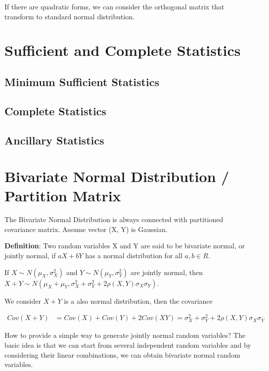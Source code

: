 \documentclass[11pt]{article} %
\begin{document}
If there are quadratic forms, we can consider the orthogonal matrix that transform to standard normal distribution.

\section{Sufficient and Complete Statistics}


\subsection{Minimum Sufficient Statistics}


\subsection{Complete Statistics}


\subsection{Ancillary Statistics}




\section{Bivariate Normal Distribution / Partition Matrix}
The Bivariate Normal Distribution is always connected with partitioned covariance matrix. Assume vector (X, Y) is Gaussian. 

\textbf{Definition}: Two random variables X and Y are said to be bivariate normal, or jointly normal, if $aX+bY$ has a normal distribution for all $a,b \in R$.

If $X \sim N( \mu_X, \sigma^2_X)$ and $Y \sim N( \mu_Y, \sigma^2_Y)$ are jointly normal, then $ X + Y  \sim N( \mu_X + \mu_Y, \sigma^2_X + \sigma^2_Y + 2 \rho(X,Y) \sigma_X \sigma_Y) $. 

We consider $X + Y$ is a also normal distribution, then the covariance 

\begin{align*}
	Cov(X+Y) &= Cov(X) + Cov(Y) + 2Cov(XY) = \sigma^2_X + \sigma^2_Y + 2 \rho(X,Y) \sigma_X \sigma_Y
\end{align*}

How to provide a simple way to generate jointly normal random variables? The basic idea is that we can start from several independent random variables and by considering their linear combinations, we can obtain bivariate normal random variables. 
\end{document}
